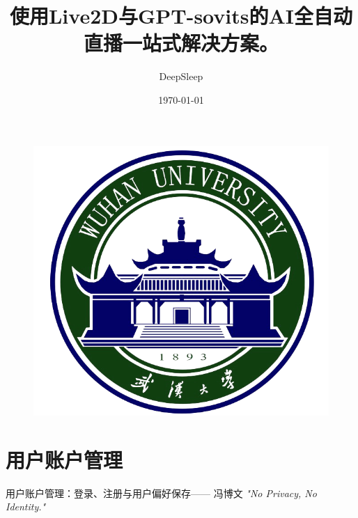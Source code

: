 \documentclass{beamer}
\author{DeepSleep}
\title{使用Live2D与GPT-sovits的AI全自动直播一站式解决方案。}
\institute{武汉大学计算机科学院}
\date{\today}
\begin{document}
	
	\begin{frame}
		\titlepage
		\begin{figure}[htpb]
			\begin{center}
				\includegraphics[width=0.2\linewidth]{pic/whulogo.png}
			\end{center}
		\end{figure}
	\end{frame}
	
	\begin{frame}
		\tableofcontents[sectionstyle=show,subsectionstyle=show/shaded/hide,subsubsectionstyle=show/shaded/hide]
	\end{frame}
	
	
	
	
	
	
	\section{用户账户管理}
	
	\begin{frame}{用户账户管理：登录、注册与用户偏好保存\hfill  —— 冯博文}
		\centering
		\textit{"No Privacy, No Identity."}
	\end{frame}
	
\end{document}
